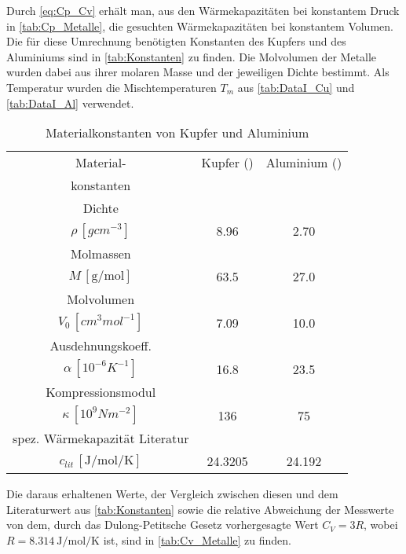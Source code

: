 	Durch \eqref{eq:Cp_Cv} erhält man, aus den Wärmekapazitäten bei konstantem Druck in \autoref{tab:Cp_Metalle}, die gesuchten 
	Wärmekapazitäten bei konstantem Volumen. Die für diese Umrechnung benötigten Konstanten des Kupfers und des Aluminiums sind 
	in \autoref{tab:Konstanten} zu finden. Die Molvolumen der Metalle wurden dabei aus ihrer molaren Masse und der jeweiligen Dichte
	bestimmt. Als Temperatur wurden die Mischtemperaturen $T_{m}$ aus \autoref{tab:DataI_Cu} und \ref{tab:DataI_Al} verwendet.
	\begin{table}[!h]
		\centering
		\begin{tabular}{|c||c|c|}
			\hline
			           Material-            & Kupfer (\ce{Cu}) & Aluminium (\ce{Al}) \\
			konstanten\cite{Mende09, V201}  &                  &  \\ \hline\hline
			            Dichte              &                  &  \\
			    $\rho\,[\si{gcm^{-3}}]$     &    \num{8.96}    &     \num{2.70}      \\ \hline
			           Molmassen            &                  &  \\
			    $M\,[\si{\g\per\mol}]$      &    \num{63.5}    &     \num{27.0}      \\ \hline
			          Molvolumen            &                  &  \\
			$V_{0}\,[\si{cm^{3}mol^{-1}}]$  &    \num{7.09}    &     \num{10.0}      \\ \hline
			Ausdehnungskoeff.\footnotemark  &                  &  \\
			$\alpha\,[\si{10^{-6}K^{-1}}]$  &    \num{16.8}    &     \num{23.5}      \\ \hline
			       Kompressionsmodul        &                  &  \\
			$\kappa\,[\si{10^{9} Nm^{-2}}]$ &    \num{136}     &      \num{75}       \\ \hline
			spez. Wärmekapazität Literatur & &\\
			$c_{lit}\,[\si{\joule\per\mol\per\kelvin}]$ & \num{24.3205} & \num{24.192} \\ \hline
		\end{tabular}
		\caption{Materialkonstanten von Kupfer und Aluminium \label{tab:Konstanten}}
	\end{table}

	Die daraus erhaltenen Werte, der Vergleich zwischen diesen und dem Literaturwert aus \autoref{tab:Konstanten}
	sowie die relative Abweichung der Messwerte von dem, durch das Dulong-Petitsche Gesetz vorhergesagte Wert
	$C_{V} = 3R$, wobei $R = \SI{8.314}{\joule\per\mol\per\kelvin}$ \cite{SciPy} ist, 
	sind in \autoref{tab:Cv_Metalle} zu finden.
	

